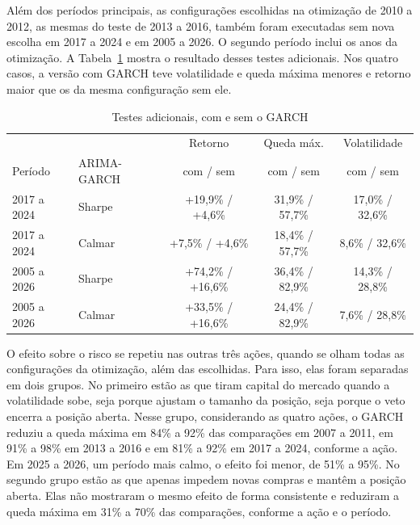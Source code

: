 Além dos períodos principais, as configurações escolhidas na otimização de 2010
a 2012, as mesmas do teste de 2013 a 2016, também foram executadas sem nova
escolha em 2017 a 2024 e em 2005 a 2026. O segundo período inclui os anos da
otimização. A Tabela~\ref{tab:efeito-adicional} mostra o resultado desses testes
adicionais. Nos quatro casos, a versão com GARCH teve volatilidade e queda máxima
menores e retorno maior que os da mesma configuração sem ele.

\begin{table}[htbp]
\centering
\caption{Testes adicionais, com e sem o GARCH}
\label{tab:efeito-adicional}
\fontsize{10}{12}\selectfont
\begin{tabular}{l|l|c|c|c}
\hline
& & Retorno & Queda máx. & Volatilidade \\
Período & ARIMA-GARCH & com / sem & com / sem & com / sem \\
\hline
2017 a 2024 & Sharpe & +19,9\% / +4,6\% & 31,9\% / 57,7\% & 17,0\% / 32,6\% \\
\hline
2017 a 2024 & Calmar & +7,5\% / +4,6\% & 18,4\% / 57,7\% & 8,6\% / 32,6\% \\
\hline
2005 a 2026 & Sharpe & +74,2\% / +16,6\% & 36,4\% / 82,9\% & 14,3\% / 28,8\% \\
\hline
2005 a 2026 & Calmar & +33,5\% / +16,6\% & 24,4\% / 82,9\% & 7,6\% / 28,8\% \\
\hline
\end{tabular}
\end{table}

O efeito sobre o risco se repetiu nas outras três ações, quando se olham todas as
configurações da otimização, além das escolhidas. Para isso, elas foram
separadas em dois grupos. No primeiro estão as que tiram capital do mercado
quando a volatilidade sobe, seja porque ajustam o tamanho da posição, seja porque
o veto encerra a posição aberta. Nesse grupo, considerando as quatro ações, o
GARCH reduziu a queda máxima em 84\% a 92\% das comparações em 2007 a 2011, em
91\% a 98\% em 2013 a 2016 e em 81\% a 92\% em 2017 a 2024, conforme a ação. Em
2025 a 2026, um período mais calmo, o efeito foi menor, de 51\% a 95\%. No segundo
grupo estão as que apenas impedem novas compras e mantêm a posição aberta. Elas não
mostraram o mesmo efeito de forma consistente e reduziram a queda máxima em 31\% a
70\% das comparações, conforme a ação e o período.


